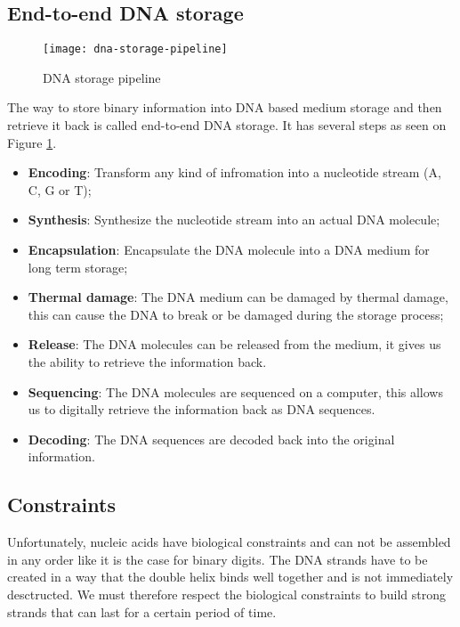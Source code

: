 \subsection{End-to-end DNA storage}

\begin{figure}
    \centering
    \texttt{[image: dna-storage-pipeline]}
    \caption{DNA storage pipeline}
    \label{fig:dna-storage-pipeline}
\end{figure}


The way to store binary information into DNA based medium storage and then retrieve it back is called end-to-end DNA storage. It has several steps as seen on Figure \ref{fig:dna-storage-pipeline}.

\begin{itemize}
    \item \textbf{Encoding}: Transform any kind of infromation into a nucleotide stream (A, C, G or T);
    \item \textbf{Synthesis}: Synthesize the nucleotide stream into an actual DNA molecule;
    \item \textbf{Encapsulation}: Encapsulate the DNA molecule into a DNA medium for long term storage;
    \item \textbf{Thermal damage}: The DNA medium can be damaged by thermal damage, this can cause the DNA to break or be damaged during the storage process;
    \item \textbf{Release}: The DNA molecules can be released from the medium, it gives us the ability to retrieve the information back.
    \item \textbf{Sequencing}: The DNA molecules are sequenced on a computer, this allows us to digitally retrieve the information back as DNA sequences.
    \item \textbf{Decoding}: The DNA sequences are decoded back into the original information.
\end{itemize}

\subsection{Constraints}

Unfortunately, nucleic acids have biological constraints and can not be assembled in any order like it is the case for binary digits. The DNA strands have to be created in a way that the double helix binds well together and is not immediately desctructed. We must therefore respect the biological constraints to build strong strands that can last for a certain period of time. 

